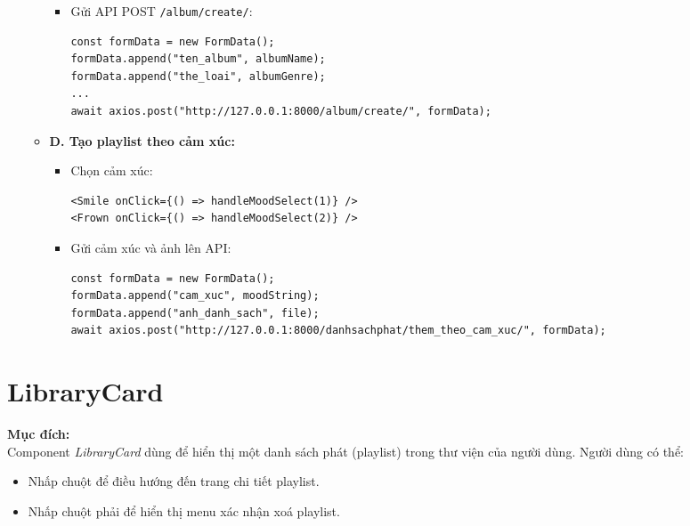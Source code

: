 \begin{itemize}
\begin{itemize}
\begin{itemize}
    \item Gửi API POST \texttt{/album/create/}:
\begin{verbatim}
const formData = new FormData();
formData.append("ten_album", albumName);
formData.append("the_loai", albumGenre);
...
await axios.post("http://127.0.0.1:8000/album/create/", formData);
\end{verbatim}
  \end{itemize}

  \item \textbf{D. Tạo playlist theo cảm xúc:}
  \begin{itemize}
    \item Chọn cảm xúc:
\begin{verbatim}
<Smile onClick={() => handleMoodSelect(1)} />
<Frown onClick={() => handleMoodSelect(2)} />
\end{verbatim}

    \item Gửi cảm xúc và ảnh lên API:
\begin{verbatim}
const formData = new FormData();
formData.append("cam_xuc", moodString);
formData.append("anh_danh_sach", file);
await axios.post("http://127.0.0.1:8000/danhsachphat/them_theo_cam_xuc/", formData);
\end{verbatim}
  \end{itemize}
\end{itemize}

\end{itemize}


\section{LibraryCard}

\textbf{Mục đích:} \\
Component \textit{LibraryCard} dùng để hiển thị một danh sách phát (playlist) trong thư viện của người dùng. Người dùng có thể:
\begin{itemize}
  \item Nhấp chuột để điều hướng đến trang chi tiết playlist.
  \item Nhấp chuột phải để hiển thị menu xác nhận xoá playlist.
\end{itemize}


